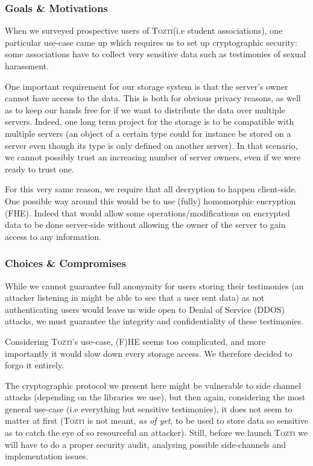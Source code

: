 \documentclass[a4paper, english]{report}
\newcommand{\tozti}{\textsc{Tozti}\xspace}
\begin{document}
\subsubsection{Goals \& Motivations}
When we surveyed prospective users of \tozti (i.e student associations), one particular use-case came up which requires us to set up cryptographic security: some associations have to collect very sensitive data such as testimonies of sexual harassment.

One important requirement for our storage system is that the server's owner cannot have access to the data. This is both for obvious privacy reasons, as well as to keep our hands free for if we want to distribute the data over multiple servers. Indeed, one long term project for the storage is to be compatible with multiple servers (an object of a certain type could for instance be stored on a server even though its type is only defined on another server). In that scenario, we cannot possibly trust an increasing number of server owners, even if we were ready to trust one.

For this very same reason, we require that all decryption to happen client-side. One possible way around this would be to use (fully) homomorphic encryption (FHE). Indeed that would allow some operations/modifications on encrypted data to be done server-side without allowing the owner of the server to gain access to any information.

\subsubsection{Choices \& Compromises}
While we cannot guarantee full anonymity for users storing their testimonies (an attacker listening in might be able to see that a user sent data) as not authenticating users would leave us wide open to Denial of Service (DDOS) attacks, we must guarantee the integrity and confidentiality of these testimonies.

Considering \tozti's use-case, (F)HE seems too complicated, and more importantly it would slow down every storage access. We therefore decided to forgo it entirely.

The cryptographic protocol we present here might be vulnerable to side channel attacks (depending on the libraries we use), but then again, considering the most general use-case (i.e everything but sensitive testimonies), it does not seem to matter at first (\tozti is not meant, \emph{as of yet}, to be used to store data so sensitive as to catch the eye of so resourceful an attacker). Still, before we launch \tozti we will have to do a proper security audit, analysing possible side-channels and implementation issues.
\end{document}
